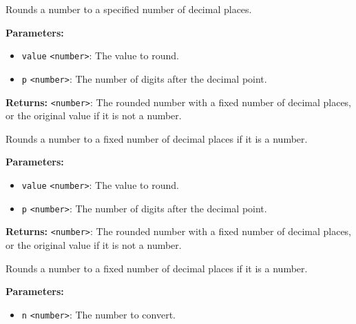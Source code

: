 \documentclass[12pt,a4paper]{article}
\begin{document}
\noindent Rounds a number to a specified number of decimal places.

\vspace{5mm}
\noindent {}


\noindent \textbf{Parameters:}
\begin{itemize}
  \item \texttt{value} \texttt{<number>}: The value to round.
  \item \texttt{p} \texttt{<number>}: The number of digits after the decimal point.
\end{itemize}

\noindent \textbf{Returns:} \texttt{<number>}: The rounded number with a fixed number of decimal places, or the original value if it is not a number.

\noindent Rounds a number to a fixed number of decimal places if it is a number.

\vspace{5mm}
\noindent {}


\noindent \textbf{Parameters:}
\begin{itemize}
  \item \texttt{value} \texttt{<number>}: The value to round.
  \item \texttt{p} \texttt{<number>}: The number of digits after the decimal point.
\end{itemize}

\noindent \textbf{Returns:} \texttt{<number>}: The rounded number with a fixed number of decimal places, or the original value if it is not a number.

\noindent Rounds a number to a fixed number of decimal places if it is a number.

\vspace{5mm}
\noindent {}


\noindent \textbf{Parameters:}
\begin{itemize}
  \item \texttt{n} \texttt{<number>}: The number to convert.
\end{itemize}
\end{document}
